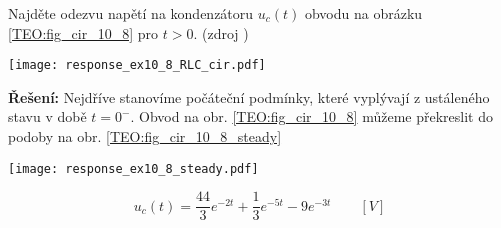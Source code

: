 \begin{example}\label{TEO:ex_10_8} Najděte odezvu napětí na kondenzátoru $u_c(t)$ obvodu na
  obrázku \ref{TEO:fig_cir_10_8} pro $t>0$. (zdroj \cite[s.~456]{Dorf}) 
  
  {\centering
   \captionsetup{type=figure}
   \texttt{[image: response\_ex10\_8\_RLC\_cir.pdf]}
   \label{TEO:fig_cir_10_8}
   \par}
  
  \textbf{Řešení:} Nejdříve stanovíme počáteční podmínky, které vyplývají z ustáleného stavu
  v době $t = 0^-$. Obvod na obr. \ref{TEO:fig_cir_10_8} můžeme překreslit do podoby na obr.
  \ref{TEO:fig_cir_10_8_steady} 
  
  {\centering
   \captionsetup{type=figure}
   \texttt{[image: response\_ex10\_8\_steady.pdf]}
   \label{TEO:fig_cir_10_8_steady}
   \par}
  \begin{equation}\label{TEO:eq_10_8_vysledek}
  u_c(t) = \frac{44}{3}e^{-2t}+\frac{1}{3}e^{-5t} - 9e^{-3t} \qquad [V]
  \end{equation}
\end{example}